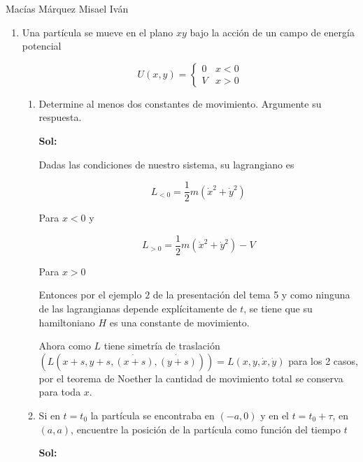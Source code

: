 \documentclass[12pt,a4paper]{article}
\begin{document}
Macías Márquez Misael Iván

\begin{enumerate}






\item Una partícula se mueve en el plano $xy$ bajo la acción de un campo de energía potencial

\begin{equation*}
    U(x,y) = \left\{\begin{matrix}
    0 & x<0 \\
    V & x> 0
    \end{matrix} \right.
\end{equation*}

\begin{enumerate}
    \item Determine al menos dos constantes de movimiento. Argumente su respuesta.
    
    \textbf{Sol:}
    
    Dadas las condiciones de nuestro sistema, su lagrangiano es
    
    \begin{equation*}
        L_{< 0} = \frac{1}{2} m (\dot{x}^2 + \dot{y}^2) 
    \end{equation*}
    
    Para $x<0$ y
    
    \begin{equation*}
        L_{ >0} = \frac{1}{2}m (\dot{x}^2 + \dot{y}^2) -V
    \end{equation*}
    
    Para $x>0$
    
    Entonces por el ejemplo $2$ de la presentación del tema 5 y como ninguna de las lagrangianas depende explícitamente de $t$, se tiene que su hamiltoniano $H$ es una constante de movimiento.
    
    Ahora como $L$ tiene simetría de traslación $(L(x+s,y+s,\dot{(x+s)},\dot{(y+s)}))=L(x,y,\dot{x},\dot{y})$ para los 2 casos, por el teorema de Noether la cantidad de movimiento total se conserva para toda $x$.
    
    
    \item Si en $t=t_0$ la partícula se encontraba en $(-a,0)$ y en el $t = t_0 + \tau$, en $(a,a)$, encuentre la posición de la partícula como función del tiempo $t$
    
    \textbf{Sol:}
    

\end{enumerate}
\end{enumerate}
\end{document}
